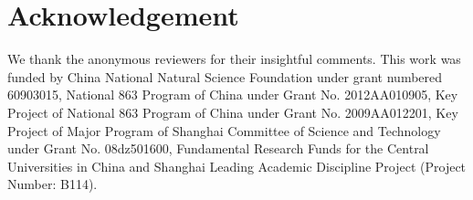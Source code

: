 \section*{Acknowledgement}

\label{sec:acknowledgment}

We thank the anonymous reviewers for their insightful comments. This work was funded by China National Natural Science Foundation under grant numbered 60903015, National 863 Program of China under Grant No. 2012AA010905, Key Project of National 863 Program of China under Grant No. 2009AA012201, Key Project of Major Program of Shanghai Committee of Science and Technology under Grant No. 08dz501600,  Fundamental Research Funds for the Central Universities in China and Shanghai Leading Academic Discipline Project (Project Number: B114).